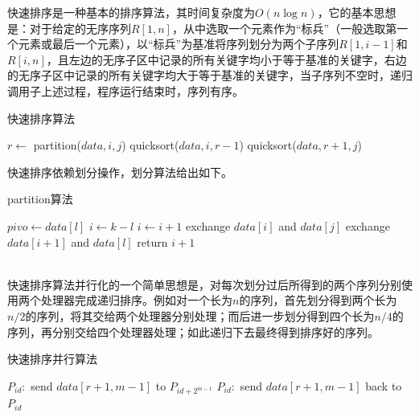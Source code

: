 \documentclass[fontsize=11pt, %
                             paper=a4, %
                             oneside, %
                             captions=tableheading,
                             index=totoc,
                             hyperref]{labbook}
\begin{document}
\begin{addmargin}[0cm]{0cm}
\indent 快速排序是一种基本的排序算法，其时间复杂度为$O(n\log{n})$，它的基本思想是：对于给定的无序序列$R[1,n]$，从中选取一个元素作为“标兵”（一般选取第一个元素或最后一个元素），以“标兵”为基准将序列划分为两个子序列$R[1,i-1]$和$R[i,n]$，且左边的无序子区中记录的所有关键字均小于等于基准的关键字，右边的无序子区中记录的所有关键字均大于等于基准的关键字，当子序列不空时，递归调用子上述过程，程序运行结束时，序列有序。\\
\begin{algorithm}
\caption{快速排序算法}\label{ser_quicksort}
\begin{algorithmic}[1]
       \State $r \gets$ partition($data, i, j$) 
   \EndIf
   \State quicksort($data, i, r-1$)
   \State quicksort($data, r+1, j$)
\EndFunction
\end{algorithmic}
\end{algorithm}
\indent 快速排序依赖划分操作，划分算法给出如下。
\begin{algorithm}
\caption{partition算法}\label{partition}
\begin{algorithmic}[1]
   \State $pivo \gets data[l]$
   \State $i \gets k-l$ 
           \State $i \gets i+1$
           \State exchange $data[i]$ and $data[j]$
       \EndIf
   \EndFor
   \State exchange $data[i+1]$ and $data[l]$
   \State return $i+1$
\EndFunction
\end{algorithmic}
\end{algorithm}\\
\indent 快速排序算法并行化的一个简单思想是，对每次划分过后所得到的两个序列分别使用两个处理器完成递归排序。例如对一个长为$n$的序列，首先划分得到两个长为$n/2$的序列，将其交给两个处理器分别处理；而后进一步划分得到四个长为$n/4$的序列，再分别交给四个处理器处理；如此递归下去最终得到排序好的序列。
\begin{algorithm}
\caption{快速排序并行算法}\label{para_quicksort}
\begin{algorithmic}[1]
    \Else
        \State $P_{id}:$ send $data[r+1, m-1]$ to $P_{id+2^{m-1}}$
        \State {}
        \State {}
        \State $P_{id}:$ send $data[r+1, m-1]$ back to $P_{id}$
    \EndIf
\EndFunction
\end{algorithmic}
\end{algorithm}


\end{addmargin}
\end{document}
